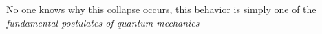 \documentclass[preview]{standalone}
\begin{document}
\begin{center}
No one knows why this collapse occurs, this behavior is simply one of the \textit{fundamental postulates of quantum mechanics}
\end{center}
\end{document}
